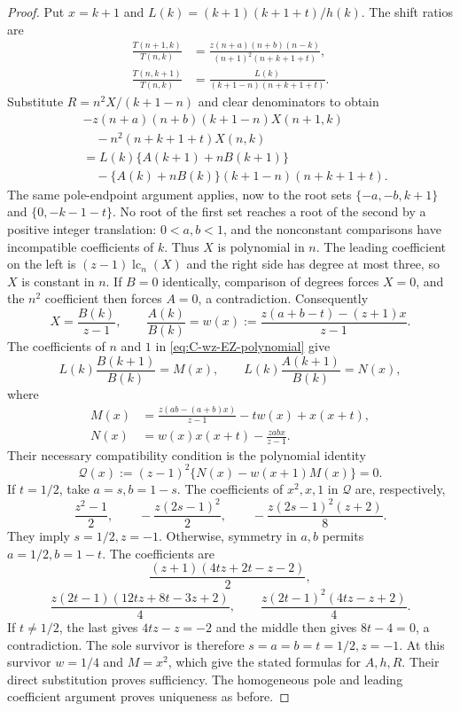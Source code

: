 \begin{proof}
Put $x=k+1$ and $L(k)=(k+1)(k+1+t)/h(k)$.  The shift ratios are
\begin{align*}
 \frac{T(n+1,k)}{T(n,k)}&=
 \frac{z(n+a)(n+b)(n-k)}{(n+1)^2(n+k+1+t)},\\
 \frac{T(n,k+1)}{T(n,k)}&=
 \frac{L(k)}{(k+1-n)(n+k+1+t)}.
\end{align*}
Substitute $R=n^2X/(k+1-n)$ and clear denominators to obtain
\begin{equation}\label{eq:C-wz-EZ-polynomial}
\begin{split}
 &-z(n+a)(n+b)(k+1-n)X(n+1,k)\\
 &\quad-n^2(n+k+1+t)X(n,k)\\
 &=L(k)\{A(k+1)+nB(k+1)\}\\
 &\quad-\{A(k)+nB(k)\}(k+1-n)(n+k+1+t).
\end{split}
\end{equation}
The same pole-endpoint argument applies, now to the root sets
$\{-a,-b,k+1\}$ and $\{0,-k-1-t\}$.  No root of the first set
reaches a root of the second by a positive integer translation:
$0<a,b<1$, and the nonconstant comparisons have incompatible
coefficients of $k$.  Thus $X$ is polynomial in $n$.  The leading
coefficient on the left is $(z-1)\operatorname{lc}_n(X)$ and the
right side has degree at most three, so $X$ is constant in $n$.
If $B=0$ identically, comparison of degrees forces $X=0$, and the
$n^2$ coefficient then forces $A=0$, a contradiction.  Consequently
\[
 X=\frac{B(k)}{z-1},\qquad
 \frac{A(k)}{B(k)}=w(x):=
 \frac{z(a+b-t)-(z+1)x}{z-1}.
\]
The coefficients of $n$ and $1$ in
\eqref{eq:C-wz-EZ-polynomial} give
\[
 L(k)\frac{B(k+1)}{B(k)}=M(x),\qquad
 L(k)\frac{A(k+1)}{B(k)}=N(x),
\]
where
\begin{align*}
 M(x)&=\frac{z(ab-(a+b)x)}{z-1}-tw(x)+x(x+t),\\
 N(x)&=w(x)x(x+t)-\frac{zabx}{z-1}.
\end{align*}
Their necessary compatibility condition is the polynomial identity
\[
 \mathcal Q(x):=(z-1)^2\{N(x)-w(x+1)M(x)\}=0.
\]
If $t=1/2$, take $a=s,b=1-s$.  The coefficients of $x^2,x,1$
in $\mathcal Q$ are, respectively,
\[
 \frac{z^2-1}{2},\qquad
 -\frac{z(2s-1)^2}{2},\qquad
 -\frac{z(2s-1)^2(z+2)}8.
\]
They imply $s=1/2,z=-1$.  Otherwise, symmetry in $a,b$ permits
$a=1/2,b=1-t$.  The coefficients are
\[
 \frac{(z+1)(4tz+2t-z-2)}2,
\]
\[
 \frac{z(2t-1)(12tz+8t-3z+2)}4,
 \qquad
 \frac{z(2t-1)^2(4tz-z+2)}4.
\]
If $t\ne1/2$, the last gives $4tz-z=-2$ and the middle then gives
$8t-4=0$, a contradiction.  The sole survivor is therefore
$s=a=b=t=1/2,z=-1$.  At this survivor $w=1/4$ and $M=x^2$,
which give the stated formulas for $A,h,R$.  Their direct
substitution proves sufficiency.  The homogeneous pole and leading
coefficient argument proves uniqueness as before.
\end{proof}

